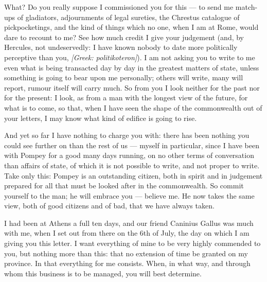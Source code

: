 

 What? Do you really suppose I commissioned you for this --- to send me match-ups of gladiators, adjournments of legal sureties, the Chrestus catalogue of pickpocketings, and the kind of things which no one, when I am at Rome, would dare to recount to me? See how much credit I give your judgement (and, by Hercules, not undeservedly: I have known nobody to date more politically perceptive than you, \textit{[Greek: politikoteron]}). I am not asking you to write to me even what is being transacted day by day in the greatest matters of state, unless something is going to bear upon me personally; others will write, many will report, rumour itself will carry much. So from you I look neither for the past nor for the present: I look, as from a man with the longest view of the future, for what is to come, so that, when I have seen the shape of the commonwealth out of your letters, I may know what kind of edifice is going to rise.

 And yet so far I have nothing to charge you with: there has been nothing you could see further on than the rest of us --- myself in particular, since I have been with Pompey for a good many days running, on no other terms of conversation than affairs of state, of which it is not possible to write, and not proper to write. Take only this: Pompey is an outstanding citizen, both in spirit and in judgement prepared for all that must be looked after in the commonwealth. So commit yourself to the man; he will embrace you --- believe me. He now takes the same view, both of good citizens and of bad, that we have always taken.

 I had been at Athens a full ten days, and our friend Caninius Gallus was much with me, when I set out from there on the 6th of July, the day on which I am giving you this letter. I want everything of mine to be very highly commended to you, but nothing more than this: that no extension of time be granted on my province. In that everything for me consists. When, in what way, and through whom this business is to be managed, you will best determine.
